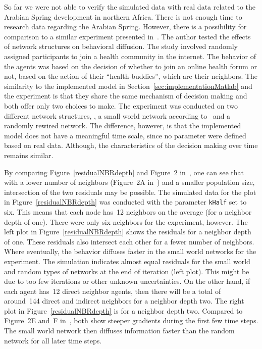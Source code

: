 So far we were not able to verify the simulated data with real data related to
the Arabian Spring development in northern Africa.  There is not enough time to
research data regarding the Arabian Spring.  However, there is a possibility
for comparison to a similar experiment presented in~\cite{centola2010spread}.
The author tested the effects of network structures on behavioral diffusion.
The study involved randomly assigned participants to join a health community in
the internet.  The behavior of the agents was based on the decision of whether
to join an online health forum or not, based on the action of their
``health-buddies'', which are their neighbors.  The similarity to the
implemented model in Section~\ref{sec:implementationMatlab} and the experiment
is that they share the same mechanism of decision making and both offer only
two choices to make.  The experiment was conducted on two different network
structures, \ie, a small world network according to~\cite{watts98} and a
randomly rewired network.  The difference, however, is that the implemented
model does not have a meaningful time scale, since no parameter were defined
based on real data.  Although, the characteristics of the decision making over
time remains similar.

By comparing Figure~\ref{residualNBRdepth} and Figure~2
in~\cite{centola2010spread}, one can see that with a lower number of neighbors
(Figure~2A in~\cite{centola2010spread}) and a smaller population size,
intersection of the two residuals may be possible.  The simulated data for the
plot in Figure~\ref{residualNBRdepth} was conducted with the parameter
\texttt{kHalf} set to six.  This means that each node has~12 neighbors on the
average (for a neighbor depth of one).  There were only six neighbors for the
experiment, however.  The left plot in Figure~\ref{residualNBRdepth} shows the
residuals for a neighbor depth of one.  These residuals also intersect each
other for a fewer number of neighbors.  Where eventually, the behavior diffuses
faster in the small world networks for the experiment.  The simulation
indicates almost equal residuals for the small world and random types of
networks at the end of iteration (left plot).  This might be due to too few
iterations or other unknown uncertainties.  On the other hand, if each agent
has~12 direct neighbor agents, then there will be a total of around~144 direct
and indirect neighbors for a neighbor depth two.  The right plot in
Figure~\ref{residualNBRdepth} is for a neighbor depth two.  Compared to
Figure~2E and~F in~\cite{centola2010spread}, both show steeper gradients during
the first few time steps.  The small world network then diffuses information
faster than the random network for all later time steps.

